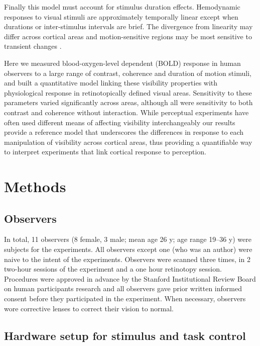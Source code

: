 \documentclass{report}
\begin{document}
Finally this model must account for stimulus duration effects. Hemodynamic responses to visual stimuli are approximately temporally linear except when durations \citep{Boynton1996-ff,Boynton2012-xy} or inter-stimulus intervals \citep{Huettel2000-ji} are brief. The divergence from linearity may differ across cortical areas \citep{Birn2001-tp} and motion-sensitive regions may be most sensitive to transient changes \citep{Stigliani2017-oe}.

Here we measured blood-oxygen-level dependent (BOLD) \citep{Ogawa1990-er} response in human observers to a large range of contrast, coherence and duration of motion stimuli, and built a quantitative model linking these visibility properties with physiological response in retinotopically defined visual areas. Sensitivity to these parameters varied significantly across areas, although all were sensitivity to both contrast and coherence without interaction. While perceptual experiments have often used different means of affecting visibility interchangeably our results provide a reference model that underscores the differences in response to each manipulation of visibility across cortical areas, thus providing a quantifiable way to interpret experiments that link cortical response to perception.

\section{Methods}

\subsection{Observers}

In total, 11 observers (8 female, 3 male; mean age 26 y; age range 19–36 y) were subjects for the experiments. All observers except one (who was an author) were naive to the intent of the experiments. Observers were scanned three times, in 2 two-hour sessions of the experiment and a one hour retinotopy session. Procedures were approved in advance by the Stanford Institutional Review Board on human participants research and all observers gave prior written informed consent before they participated in the experiment. When necessary, observers wore corrective lenses to correct their vision to normal.

\subsection{Hardware setup for stimulus and task control}
\end{document}
